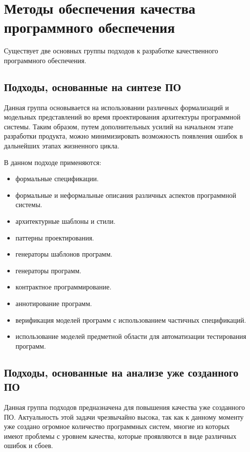 \section{Методы обеспечения качества программного обеспечения}

Существует две основных группы подходов к разработке качественного программного
обеспечения.

\subsection{Подходы, основанные на синтезе ПО} %

Данная группа основывается на использовании различных формализаций и модельных
представлений во время проектирования архитектуры программной системы. Таким
образом, путем дополнительных усилий на начальном этапе разработки продукта,
можно минимизировать возможность появления ошибок в дальнейших этапах жизненного
цикла.

В данном подходе применяются:

\begin{itemize}
    \item формальные спецификации.
    \item формальные и неформальные описания различных аспектов программной
    системы.
    \item архитектурные шаблоны и стили.
    \item паттерны проектирования.
    \item генераторы шаблонов программ.
    \item генераторы программ.
    \item контрактное программирование.
    \item аннотирование программ.
    \item верификация моделей программ с использованием частичных спецификаций.
    \item использование моделей предметной области для автоматизации
    тестирования программ.
\end{itemize}

\subsection{Подходы, основанные на анализе уже созданного ПО} %

Данная группа подходов предназначена для повышения качества уже созданного ПО.
Актуальность этой задачи чрезвычайно высока, так как к данному моменту уже
создано огромное количество программных систем, многие из которых имеют проблемы
с уровнем качества, которые проявляются в виде различных ошибок и сбоев.

